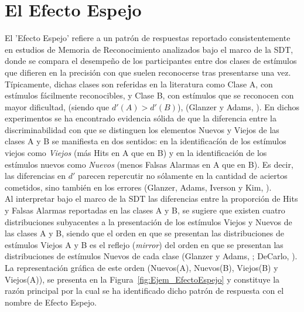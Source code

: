 \section{El Efecto Espejo}

El 'Efecto Espejo' refiere a un patrón de respuestas reportado consistentemente en estudios de Memoria de Reconocimiento analizados bajo el marco de la SDT, donde se compara el desempeño de los participantes entre dos clases de estímulos que difieren en la precisión con que suelen reconocerse tras presentarse una vez. Típicamente, dichas clases son referidas en la literatura como Clase A, con estímulos fácilmente reconocibles, y Clase B, con estímulos que se reconocen con mayor dificultad, (siendo que $d'(A) > d'(B)$), (Glanzer y Adams, \citeyear{Glanzer1990}). En dichos experimentos se ha encontrado evidencia sólida de que la diferencia entre la discriminabilidad con que se distinguen los elementos Nuevos y Viejos de las clases A y B se manifiesta en dos sentidos: en la identificacíón de los estímulos viejos como \textit{Viejos} (más Hits en A que en B) y en la identificación de los estímulos nuevos como \textit{Nuevos} (menos Falsas Alarmas en A que en B). Es decir, las diferencias en $d'$ parecen repercutir no sólamente en la cantidad de aciertos cometidos, sino también en los errores (Glanzer, Adams, Iverson y Kim, \citeyear{Glanzer1993}).\\

Al interpretar bajo el marco de la SDT las diferencias entre la proporción de Hits y Falsas Alarmas reportadas en las clases A y B, se sugiere que existen cuatro distribuciones subyacentes a la presentación de los estímulos Viejos y Nuevos de las clases A y B, siendo que el orden en que se presentan las distribuciones de estímulos Viejos A y B es el reflejo (\textit{mirror}) del orden en que se presentan las distribuciones de estímulos Nuevos de cada clase (Glanzer y Adams, \citeyear{Glanzer1990}; DeCarlo, \citeyear{DeCarlo2007}). La representación gráfica de este orden (Nuevos(A), Nuevos(B), Viejos(B) y Viejos(A)), se presenta en la Figura~\ref{fig:Ejem_EfectoEspejo} y constituye la razón principal por la cual se ha identificado dicho patrón de respuesta con el nombre de Efecto Espejo.\\


